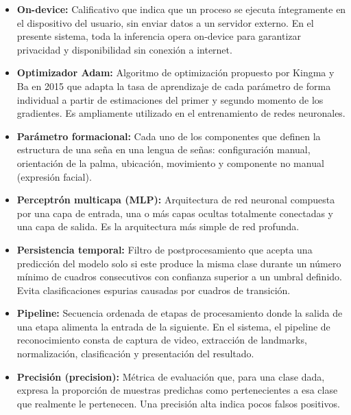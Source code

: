 \begin{itemize}
    \item[] \textbf{On-device:} Calificativo que indica que un proceso se ejecuta íntegramente en el dispositivo del usuario, sin enviar datos a un servidor externo. En el presente sistema, toda la inferencia opera on-device para garantizar privacidad y disponibilidad sin conexión a internet.\\

    \item[] \textbf{Optimizador Adam:} Algoritmo de optimización propuesto por Kingma y Ba en 2015 que adapta la tasa de aprendizaje de cada parámetro de forma individual a partir de estimaciones del primer y segundo momento de los gradientes. Es ampliamente utilizado en el entrenamiento de redes neuronales.\\

    \item[] \textbf{Parámetro formacional:} Cada uno de los componentes que definen la estructura de una seña en una lengua de señas: configuración manual, orientación de la palma, ubicación, movimiento y componente no manual (expresión facial).\\

    \item[] \textbf{Perceptrón multicapa (MLP):} Arquitectura de red neuronal compuesta por una capa de entrada, una o más capas ocultas totalmente conectadas y una capa de salida. Es la arquitectura más simple de red profunda.\\

    \item[] \textbf{Persistencia temporal:} Filtro de postprocesamiento que acepta una predicción del modelo solo si este produce la misma clase durante un número mínimo de cuadros consecutivos con confianza superior a un umbral definido. Evita clasificaciones espurias causadas por cuadros de transición.\\

    \item[] \textbf{Pipeline:} Secuencia ordenada de etapas de procesamiento donde la salida de una etapa alimenta la entrada de la siguiente. En el sistema, el pipeline de reconocimiento consta de captura de video, extracción de landmarks, normalización, clasificación y presentación del resultado.\\

    \item[] \textbf{Precisión (precision):} Métrica de evaluación que, para una clase dada, expresa la proporción de muestras predichas como pertenecientes a esa clase que realmente le pertenecen. Una precisión alta indica pocos falsos positivos.\\


\end{itemize}
